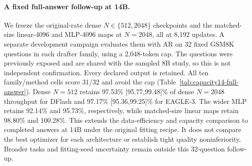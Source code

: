 \documentclass{article}
\begin{document}
\begin{table}[H]
\centering\footnotesize
\setlength{\tabcolsep}{4pt}

\caption{Targeted EAGLE-3/14B learning-rate checks, one fitting seed.
Original learning rate is 0.0006. Ratios compare the lower-rate map with
the original map at matched architecture, records and 8,192 updates on
eight exposed MATH questions, with paired 95\% request intervals.
All four checks are retained. Four of eight outputs reach the 512-token
cap for every method, so these are development throughput results,
not full-answer quality confirmation.}
\label{tab:rate-check}
\end{table}
\paragraph{A fixed full-answer follow-up at 14B.}
We freeze the original-rate dense $N\in\{512,2048\}$ checkpoints and
the matched-size linear-4096 and MLP-4096 maps at $N=2048$, all at
8,192 updates. A separate development campaign evaluates them with AR
on 32 fixed GSM8K questions in each drafter family, using a 2,048-token
cap. The questions were previously exposed and are shared with the
sampled 8B study, so this is not independent confirmation. Every declared
output is retained. All ten family/method cells score 31/32 and avoid
the cap (Table~\ref{tab:capacity14-full-answer}). Dense $N=512$ retains
97.53\% [95.77,99.48]\% of dense $N=2048$ throughput for DFlash and
97.17\% [95.36,99.25]\% for EAGLE-3. The wider MLP retains 92.14\%
and 95.73\%, respectively, while matched-size linear maps retain
98.80\% and 100.28\%. This extends the data-efficiency and capacity
comparison to completed answers at 14B under the original fitting recipe.
It does not compare the best optimizer for each architecture or establish
tight quality noninferiority. Broader tasks and fitting-seed uncertainty
remain outside this 32-question follow-up.

\begin{table}[H]
\centering\small

\caption{Full-answer 14B development comparison, 32 shared GSM8K questions
per family. All fitted checkpoints use learning rate 0.0006 and 8,192
updates. Weight counts concern the mapper. Paired 95\% intervals use
10,000 question-bootstrap draws, seed 1729, conditioning on the fixed
checkpoints. Correctness does not establish one-point noninferiority.}
\label{tab:capacity14-full-answer}
\end{table}
\end{document}
